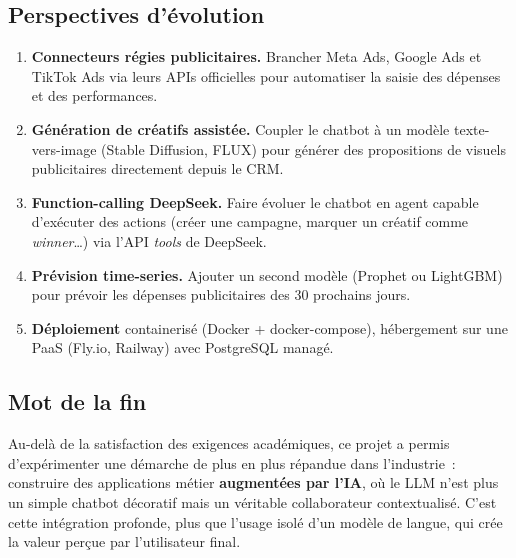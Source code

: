 \subsection{Perspectives d'évolution}

\begin{enumerate}
    \item \textbf{Connecteurs régies publicitaires.} Brancher Meta Ads,
    Google Ads et TikTok Ads via leurs APIs officielles pour automatiser
    la saisie des dépenses et des performances.
    \item \textbf{Génération de créatifs assistée.} Coupler le chatbot à
    un modèle texte-vers-image (Stable Diffusion, FLUX) pour générer des
    propositions de visuels publicitaires directement depuis le CRM.
    \item \textbf{Function-calling DeepSeek.} Faire évoluer le chatbot en
    agent capable d'exécuter des actions (créer une campagne, marquer un
    créatif comme \emph{winner}\ldots) via l'API \emph{tools} de DeepSeek.
    \item \textbf{Prévision time-series.} Ajouter un second modèle
    (Prophet ou LightGBM) pour prévoir les dépenses publicitaires des 30
    prochains jours.
    \item \textbf{Déploiement} containerisé (Docker + docker-compose),
    hébergement sur une PaaS (Fly.io, Railway) avec PostgreSQL managé.
\end{enumerate}

\subsection{Mot de la fin}

Au-delà de la satisfaction des exigences académiques, ce projet a permis
d'expérimenter une démarche de plus en plus répandue dans l'industrie~:
construire des applications métier \textbf{augmentées par l'IA}, où le LLM
n'est plus un simple chatbot décoratif mais un véritable collaborateur
contextualisé. C'est cette intégration profonde, plus que l'usage isolé
d'un modèle de langue, qui crée la valeur perçue par l'utilisateur final.
